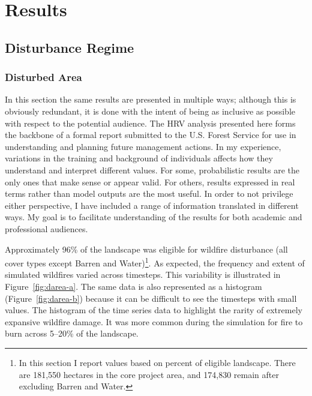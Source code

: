 \section{Results}
\label{sec:hrvresults}
\subsection{Disturbance Regime}

\subsubsection{Disturbed Area} 


In this section the same results are presented in multiple ways; although this is obviously redundant, it is done with the intent of being as inclusive as possible with respect to the potential audience. The HRV analysis presented here forms the backbone of a formal report submitted to the U.S. Forest Service for use in understanding and planning future management actions. In my experience, variations in the training and background of individuals affects how they understand and interpret different values. For some, probabilistic results are the only ones that make sense or appear valid. For others, results expressed in real terms rather than model outputs are the most useful. In order to not privilege either perspective, I have included a range of information translated in different ways. My goal is to facilitate understanding of the results for both academic and professional audiences.

Approximately 96\% of the landscape was eligible for wildfire disturbance (all cover types except Barren and Water)\footnote{In this section I report values based on percent of eligible landscape. There are 181,550 hectares in the core project area, and 174,830 remain after excluding Barren and Water.}. As expected, the frequency and extent of simulated wildfires varied across timesteps. This variability is illustrated in Figure~\ref{fig:darea-a}. The same data is also represented as a histogram (Figure~\ref{fig:darea-b}) because it can be difficult to see the timesteps with small values. The histogram of the time series data to highlight the rarity of extremely expansive wildfire damage. It was more common during the simulation for fire to burn across 5--20\% of the landscape.

